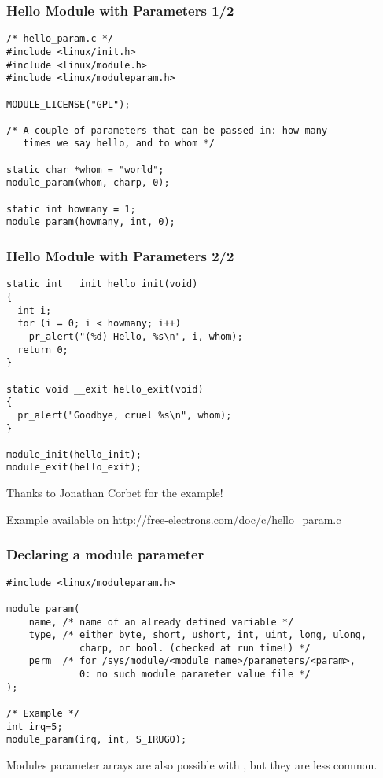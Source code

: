 \begin{frame}[fragile]
  \frametitle{Hello Module with Parameters 1/2}
\begin{verbatim}
/* hello_param.c */
#include <linux/init.h>
#include <linux/module.h>
#include <linux/moduleparam.h>

MODULE_LICENSE("GPL");

/* A couple of parameters that can be passed in: how many
   times we say hello, and to whom */

static char *whom = "world";
module_param(whom, charp, 0);

static int howmany = 1;
module_param(howmany, int, 0);

\end{verbatim}
\end{frame}

\begin{frame}[fragile]
  \frametitle{Hello Module with Parameters 2/2}
\begin{verbatim}
static int __init hello_init(void)
{
  int i;
  for (i = 0; i < howmany; i++)
    pr_alert("(%d) Hello, %s\n", i, whom);
  return 0;
}

static void __exit hello_exit(void)
{
  pr_alert("Goodbye, cruel %s\n", whom);
}

module_init(hello_init);
module_exit(hello_exit);
\end{verbatim}
Thanks to Jonathan Corbet for the example!

Example available on \url{http://free-electrons.com/doc/c/hello_param.c}
\end{frame}

\begin{frame}[fragile]
  \frametitle{Declaring a module parameter}

\begin{verbatim}
#include <linux/moduleparam.h>

module_param(
    name, /* name of an already defined variable */
    type, /* either byte, short, ushort, int, uint, long, ulong,
             charp, or bool. (checked at run time!) */ 
    perm  /* for /sys/module/<module_name>/parameters/<param>,
             0: no such module parameter value file */
);

/* Example */
int irq=5;
module_param(irq, int, S_IRUGO);
\end{verbatim}
Modules parameter arrays are also possible with
, but they are less common.
\end{frame}

